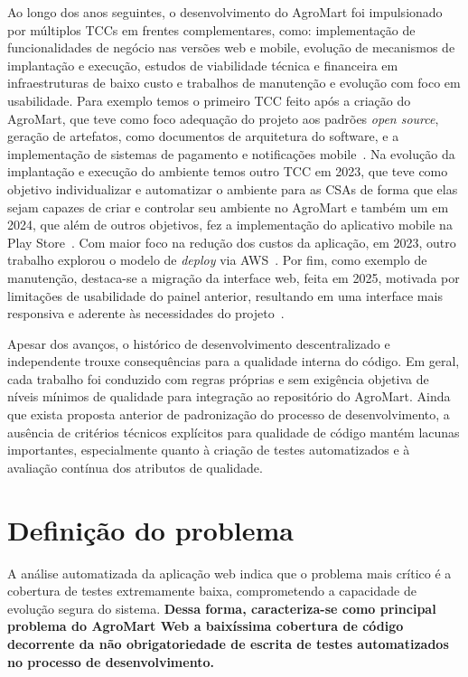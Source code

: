 Ao longo dos anos seguintes, o desenvolvimento do AgroMart foi impulsionado por múltiplos TCCs em frentes complementares, como:
implementação de funcionalidades de negócio nas versões web e mobile, evolução de mecanismos de implantação e execução,
estudos de viabilidade técnica e financeira em infraestruturas de baixo custo e trabalhos de manutenção e evolução com foco em usabilidade.
Para exemplo temos o primeiro TCC feito após a criação do AgroMart, que teve como foco adequação do projeto aos padrões \textit{open source},
geração de artefatos, como documentos de arquitetura do software, e a implementação de sistemas de pagamento e notificações mobile~\cite{correa2023evolucaoagromart}.
Na evolução da implantação e execução do ambiente temos outro TCC em 2023, que teve como objetivo individualizar e automatizar o ambiente para as CSAs de forma que elas sejam
capazes de criar e controlar seu ambiente no AgroMart e também um em 2024, que além de outros objetivos, fez a implementação do aplicativo mobile na Play Store~\cite{freitas2023implantacaoagromart, siqueira2024integracaoagromart}.
Com maior foco na redução dos custos da aplicação, em 2023, outro trabalho explorou o modelo de \textit{deploy} via AWS\@~\cite{ribeiro2023agromartcloud}.
Por fim, como exemplo de manutenção, destaca-se a migração da interface web, feita em 2025, motivada por limitações de usabilidade do painel anterior,
resultando em uma interface mais responsiva e aderente às necessidades do projeto~\cite{nishimura2025agromart}.

Apesar dos avanços, o histórico de desenvolvimento descentralizado e independente trouxe consequências para a qualidade interna do código.
Em geral, cada trabalho foi conduzido com regras próprias e sem exigência objetiva de níveis mínimos de qualidade para integração ao repositório do AgroMart.
Ainda que exista proposta anterior de padronização do processo de desenvolvimento, a ausência de critérios técnicos explícitos para qualidade de código mantém lacunas importantes,
especialmente quanto à criação de testes automatizados e à avaliação contínua dos atributos de qualidade.

\section{Definição do problema}

A análise automatizada da aplicação web indica que o problema mais crítico é a cobertura de testes extremamente baixa, comprometendo a capacidade de evolução segura do sistema.
\textbf{Dessa forma, caracteriza-se como principal problema do AgroMart Web a baixíssima cobertura de código decorrente da não obrigatoriedade de escrita de testes automatizados no processo de desenvolvimento.}

